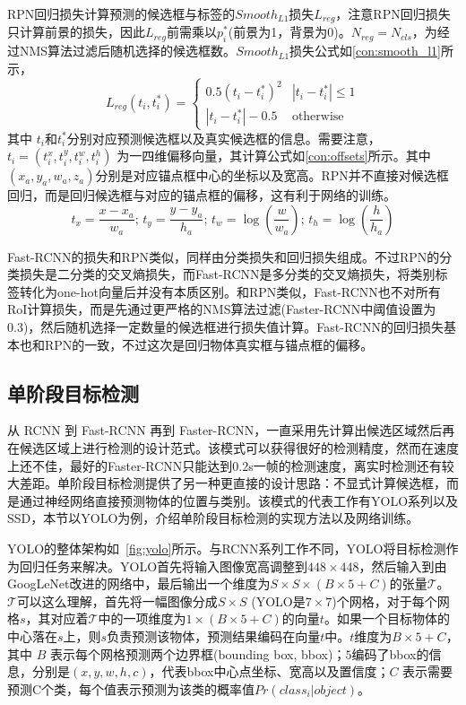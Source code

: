 RPN回归损失计算预测的候选框与标签的$Smooth_{L1}$损失$L_{reg}$，注意RPN回归损失只计算前景的损失，因此$L_{reg}$前需乘以$p^*_i$(前景为1，背景为0)。$N_{reg} = N_{cls}$，为经过NMS算法过滤后随机选择的候选框数。$Smooth_{L1}$损失公式如\ref{con:smooth_l1}所示，
\begin{equation}
L_{reg}(t_i,t^*_i) = 
\begin{cases}
0.5(t_i-t^*_i)^2 & |t_i-t^*_i| \leq 1 \\
|t_i-t^*_i| - 0.5 & \text{otherwise}
\end{cases}
\label{con:smooth_l1}
\end{equation}
其中 $t_i$和$t^*_i$分别对应预测候选框以及真实候选框的信息。需要注意，$t_i = (t^x_i, t^y_i,t^w_i,t^h_i)$ 为一四维偏移向量，其计算公式如\ref{con:offsets}所示。其中$(x_a,y_a,w_a,z_a)$分别是对应锚点框中心的坐标以及宽高。RPN并不直接对候选框回归，而是回归候选框与对应的锚点框的偏移，这有利于网络的训练。
\begin{equation}
t_x = \frac{x - x_{a}}{w_{a}}; \, t_y = \frac{y - y_{a}}{h_{a}}; \,
t_w = \log(\frac{w}{w_{a}}); \, t_h = \log(\frac{h}{h_{a}})
\label{con:offsets}
\end{equation}

Fast-RCNN的损失和RPN类似，同样由分类损失和回归损失组成。不过RPN的分类损失是二分类的交叉熵损失，而Fast-RCNN是多分类的交叉熵损失，将类别标签转化为one-hot向量后并没有本质区别。和RPN类似，Fast-RCNN也不对所有RoI计算损失，而是先通过更严格的NMS算法过滤(Faster-RCNN中阈值设置为0.3)，然后随机选择一定数量的候选框进行损失值计算。Fast-RCNN的回归损失基本也和RPN的一致，不过这次是回归物体真实框与锚点框的偏移。
\subsection{单阶段目标检测}
\label{one-stage}
从 RCNN 到 Fast-RCNN 再到 Faster-RCNN，一直采用先计算出候选区域然后再在候选区域上进行检测的设计范式。该模式可以获得很好的检测精度，然而在速度上还不佳，最好的Faster-RCNN只能达到0.2s一帧的检测速度，离实时检测还有较大差距。单阶段目标检测提供了另一种更直接的设计思路：不显式计算候选框，而是通过神经网络直接预测物体的位置与类别。该模式的代表工作有YOLO系列以及SSD，本节以YOLO为例，介绍单阶段目标检测的实现方法以及网络训练。




YOLO的整体架构如\figurename \, \ref{fig:yolo}所示。与RCNN系列工作不同，YOLO将目标检测作为回归任务来解决。YOLO首先将输入图像宽高调整到$448 \times 448$，然后输入到由GoogLeNet改进的网络中，最后输出一个维度为$S \times S \times (B \times 5 + C)$的张量$\mathcal{T}$。$\mathcal{T}$可以这么理解，首先将一幅图像分成$S \times S$ (YOLO是$7\times 7$)个网格，对于每个网格$s$，其对应着$\mathcal{T}$中的一项维度为$1 \times (B \times 5 + C)$的向量$t$。如果一个目标物体的中心落在$s$上，则$s$负责预测该物体，预测结果编码在向量$t$中。$t$维度为$B \times 5 + C$，其中 $B$ 表示每个网格预测两个边界框(bounding box, bbox)；$5$编码了bbox的信息，分别是$(x,y,w,h,c)$，代表bbox中心点坐标、宽高以及置信度；$C$ 表示需要预测C个类，每个值表示预测为该类的概率值$Pr(class_i|object)$。

